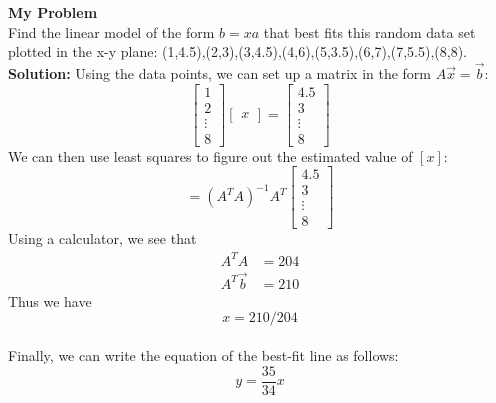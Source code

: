 \documentclass[letter]{article}
\newenvironment{menumerate}{\edef\backupindent{\the\parindent}
  \enumerate\setlength{\parindent}{\backupindent}}
  {\endenumerate}
\begin{document}
\begin{menumerate}
    \newpage
    \item \textbf{My Problem} \\Find the linear model of the form $b = xa$ that best fits this random data set plotted in the x-y plane: (1,4.5),(2,3),(3,4.5),(4,6),(5,3.5),(6,7),(7,5.5),(8,8).\\
    \textbf{Solution:}
    Using the data points, we can set up a matrix in the form $A\vec{x} = \vec{b}$:
        \begin{equation*}
            \begin{bmatrix}
                1\\2\\\vdots\\8
            \end{bmatrix}
            \begin{bmatrix}
                x
            \end{bmatrix}
            =
            \begin{bmatrix}
                4.5\\3\\\vdots\\8
            \end{bmatrix}
        \end{equation*}
        We can then use least squares to figure out the estimated value of $[x]$:
        \begin{equation*}
            [x] = (A^TA)^{-1}A^T
            \begin{bmatrix}
                4.5\\3\\\vdots\\8
            \end{bmatrix}
        \end{equation*}
        Using a calculator, we see that
        \begin{equation*}
            \begin{aligned}
                A^TA &= 204\\
                A^T\vec{b} &= 210
            \end{aligned}
        \end{equation*}
        Thus we have
        \begin{equation*}
            x = 210/204
        \end{equation*}
        \\Finally, we can write the equation of the best-fit line as follows:
        \begin{equation*}
            \boxed{y = \frac{35}{34}x}
        \end{equation*}


\end{menumerate}
\end{document}
